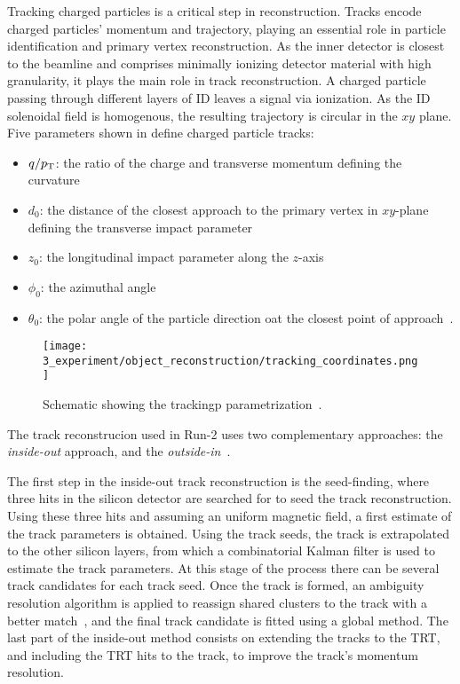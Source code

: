 Tracking charged particles is a critical step in reconstruction. Tracks encode charged particles' momentum and trajectory, playing an essential role in particle identification and primary vertex reconstruction. As the inner detector is closest to the beamline and comprises minimally ionizing detector material with high granularity, it plays the main role in track reconstruction. A charged particle passing through different layers of \ac{ID} leaves a signal via ionization. As the \ac{ID} solenoidal field is homogenous, the resulting trajectory is circular in the \(xy\) plane. Five parameters shown in \Fig{\ref{fig:objects:track_vtx:track_parameters}} define charged particle tracks:
\begin{itemize}
    \item \(q/p_{\text{T}}\): the ratio of the charge and transverse momentum defining the curvature
    \item \(d_0\): the distance of the closest approach to the primary vertex in \(xy\)-plane defining the transverse impact parameter
    \item \(z_0\): the longitudinal impact parameter along the \(z\)-axis
    \item \(\phi_0\): the azimuthal angle
    \item \(\theta_0\): the polar angle of the particle direction oat the closest point of approach~\cite{PerformanceTracksRun2}.
\end{itemize}

\begin{figure}[ht!]
    \centering
    \texttt{[image: 3\_experiment/object\_reconstruction/tracking\_coordinates.png]}
    \caption{Schematic showing the trackingp parametrization~\cite{ATLASTracking2007}.}
    \label{fig:objects:track_vtx:track_parameters}
\end{figure}

The track reconstrucion used in Run-2 uses two complementary approaches: the \textit{inside-out} approach, and the \textit{outside-in}~\cite{ATLASNEWT}. 

The first step in the inside-out track reconstruction is the seed-finding, where three hits in the silicon detector are searched for to seed the track reconstruction. Using these three hits and assuming an uniform magnetic field, a first estimate of the track parameters is obtained. Using the track seeds, the track is extrapolated to the other silicon layers, from which a combinatorial Kalman filter is used to estimate the track parameters. At this stage of the process there can be several track candidates for each track seed. Once the track is formed, an ambiguity resolution algorithm is applied to reassign shared clusters to the track with a better match~\cite{ATLASNNClustering}, and the final track candidate is fitted using a global \chisq method. The last part of the inside-out method consists on extending the tracks to the \ac{TRT}, and including the \ac{TRT} hits to the track, to improve the track's momentum resolution.

